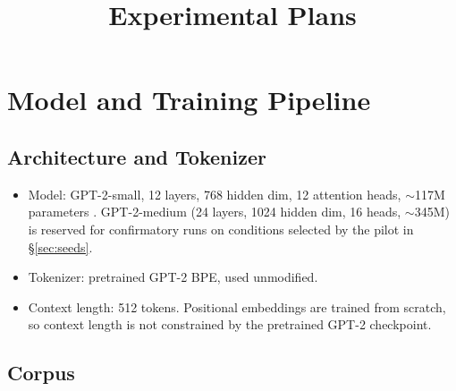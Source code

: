 \documentclass[11pt]{article}
\title{Experimental Plans}
\author{}
\date{}
\begin{document}
\maketitle


\section{Model and Training Pipeline}

\subsection{Architecture and Tokenizer}

\begin{itemize}
  \item Model: GPT-2-small, 12 layers, 768 hidden dim, 12 attention heads,
    $\sim$117M parameters \citep{radford2019language}. GPT-2-medium (24 layers,
    1024 hidden dim, 16 heads, $\sim$345M) is reserved for confirmatory runs on
    conditions selected by the pilot in \S\ref{sec:seeds}.
  \item Tokenizer: pretrained GPT-2 BPE, used unmodified.
  \item Context length: 512 tokens. Positional embeddings are trained from
    scratch, so context length is not constrained by the pretrained GPT-2
    checkpoint.
\end{itemize}

\subsection{Corpus}
\label{sec:corpus}
\end{document}
